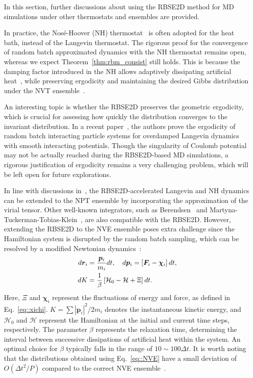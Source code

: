 In this section, further discussions about using the RBSE2D method for MD simulations under other thermostats and ensembles are provided.

In practice, the Nos{\'e}-Hoover (NH) thermostat~\cite{hoover1985canonical} is often adopted for the heat bath, instead of the Langevin thermostat. 
The rigorous proof for the convergence of random batch approximated dynamics with the NH thermostat remains open, whereas we expect Theorem~\ref{thm:rbm_consist} still holds. 
This is because the damping factor introduced in the NH allows adaptively dissipating artificial heat~\cite{jones2011adaptive}, while preserving ergodicity and maintaining the desired Gibbs distribution under the NVT ensemble~\cite{herzog2018exponential}.

An interesting topic is whether the RBSE2D preserves the geometric ergodicity, which is crucial for assessing how quickly the distribution converges to the invariant distribution. 
In a recent paper~\cite{jin2023ergodicity}, the authors prove the ergodicity of random batch interacting particle systems for overdamped Langevin dynamics with smooth interacting potentials. 
Though the singularity of Coulomb potential may not be actually reached during the RBSE2D-based MD simulations, a rigorous justification of ergodicity remains a very challenging problem, which will be left open for future explorations.

In line with discussions in~\cite{10.1063/5.0107140}, the RBSE2D-accelerated Langevin and NH dynamics can be extended to the NPT ensemble by incorporating the approximation of the virial tensor. Other well-known integrators, such as Berendsen~\cite{berendsen1984molecular} and Martyna-Tuckerman-Tobias-Klein~\cite{martyna1996explicit}, are also compatible with the RBSE2D. However, extending the RBSE2D to the NVE ensemble poses extra challenge since the Hamiltonian system is disrupted by the random batch sampling, which can be resolved by a modified Newtonian dynamics~\cite{liang2023energy}:
\begin{equation}\label{eq::NVE}
	\begin{split}
		d\boldsymbol{r}_i&=\frac{\boldsymbol{p}_i}{m_i}dt,\quad d \bm{p}_i=\left[\boldsymbol{F}_i-\bm{\chi}_i\right]dt,\\
		dK&=\frac{1}{\beta}\left[\mathcal H_0-\mathcal H+\Xi\right] dt.
	\end{split}
\end{equation}
Here, $\Xi$ and $\bm{\chi}_i$ represent the fluctuations of energy and force, as defined in Eq.~\eqref{eq::xichi}. $K=\sum |\bm{p}_i|^2/2m_i$ denotes the instantaneous kinetic energy, and $\mathcal H_0$ and $\mathcal H$ represent the Hamiltonian at the initial and current time steps, respectively. The parameter $\beta$ represents the relaxation time, determining the interval between successive dissipations of artificial heat within the system. An optimal choice for $\beta$ typically falls in the range of $10\sim 100\Delta t$. It is worth noting that the distributions obtained using Eq.~\eqref{eq::NVE} have a small deviation of $O(\Delta t^2/P)$ compared to the correct NVE ensemble~\cite{liang2023energy}.

